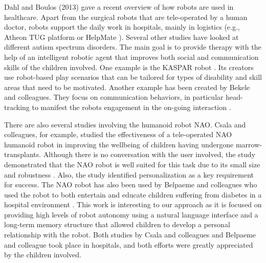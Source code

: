 \documentclass[letterpaper]{article}
\begin{document}
Dahl and Boulos (2013) \nocite{robotics3010001} gave a recent overview of how robots are used in
healthcare. Apart from the  surgical robots that are tele-operated by a human doctor, robots support
the daily work in hospitals, mainly in logistics (e.g., Atheon TUG platform \cite{bloss2011mobile}
or HelpMate \cite{evans1998helpmate}). Several other studies have looked at different autism
spectrum disorders. The main goal is to provide therapy with the help of an intelligent robotic
agent that improves both social and communication skills of the children involved. One example is
the KASPAR robot \cite{robins2012scenarios}. Its creators use robot-based play scenarios that can
be tailored for types of disability and skill areas that need to be motivated. Another example has
been created by Bekele and colleagues. They focus on communication behaviors, in particular
head-tracking to manifest the robots engagement in the on-going interaction \cite{bekele2013step}.  

There are also several studies involving the humanoid robot NAO. Csala and colleagues, for example,
studied the effectiveness of a tele-operated NAO humanoid robot in improving the wellbeing of
children having undergone marrow-transplants. Although there is no conversation with the user
involved, the study demonstrated that the NAO robot is well suited for this task due to its small
size and robustness \cite{Csala2012}. Also, the study identified personalization as a key
requirement for success. The NAO robot has also been used by Belpaeme and colleagues who used the
robot to both entertain and educate children suffering from diabetes in a hospital environment
\cite{belpaeme2012multimodal}. This work is interesting to our approach as it is focused on
providing high levels of robot autonomy using a natural language interface and a long-term memory
structure that allowed children to develop a personal relationship with the robot. Both studies by
Csala and colleagues and Belpaeme and colleague took place in hospitals, and both efforts were
greatly appreciated by the children involved.

\end{document}
